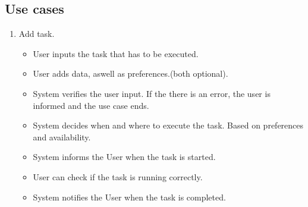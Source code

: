 \subsection{Use cases}
\begin{enumerate}
	\item Add task.
	\begin{itemize}
		\item User inputs the task that has to be executed.
		\item User adds data, aswell as preferences.(both optional).
		\item System verifies the user input. If the there is an error, the user is informed and the use case ends.
		\item System decides when and where to execute the task. Based on preferences and availability.
		\item System informs the User when the task is started.
		\item User can check if the task is running correctly.
		\item System notifies the User when the task is completed.
	\end{itemize}
\end{enumerate}